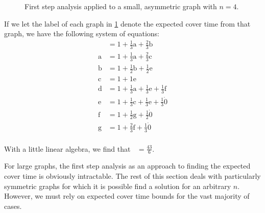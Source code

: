 \documentclass[12pt]{article}
\theoremstyle{definition}
\DeclareMathOperator{\cov}{t_\textrm{cov}}  %
\begin{document}
\begin{figure}[ht]
	\caption{First step analysis applied to a small, asymmetric graph with $n=4$.}\label{fig:example}
\end{figure}

If we let the label of each graph in \cref{fig:example}
denote the expected cover time from that graph, we have the following system
of equations:
\begin{align}
\cov &= 1 + \frac{1}{3}\textrm{a} + \frac{2}{3}\textrm{b} \nonumber \\
\textrm{a} &= 1 + \frac{1}{3}\textrm{a} + \frac{2}{3}\textrm{c} \nonumber \\
\textrm{b} &= 1 + \frac{1}{2}\textrm{b} + \frac{1}{2}\textrm{e} \nonumber \\
\textrm{c} &= 1 + 1\textrm{e} \nonumber\\
\textrm{d} &= 1 + \frac{1}{3}\textrm{a} + \frac{1}{3}\textrm{e} + \frac{1}{3}\textrm{f} \nonumber \\
\textrm{e} &= 1 + \frac{1}{3}\textrm{c} + \frac{1}{3}\textrm{e} + \frac{1}{3}\dot 0\nonumber \\
\textrm{f} &= 1 + \frac{1}{2}\textrm{g} + \frac{1}{2}\dot 0\nonumber \\
\textrm{g} &= 1 + \frac{2}{3}\textrm{f} + \frac{1}{3}\dot 0\nonumber \\
\end{align}

With a little linear algebra, we find that $\cov = \frac{43}{6}$.

For large graphs, the first step analysis as an approach to finding the expected
cover time is obviously intractable.
The rest of this section deals with particularly symmetric graphs
for which it is possible find a solution for an arbitrary $n$.
However, we must rely on expected cover time bounds for the vast majority of cases.
\end{document}
